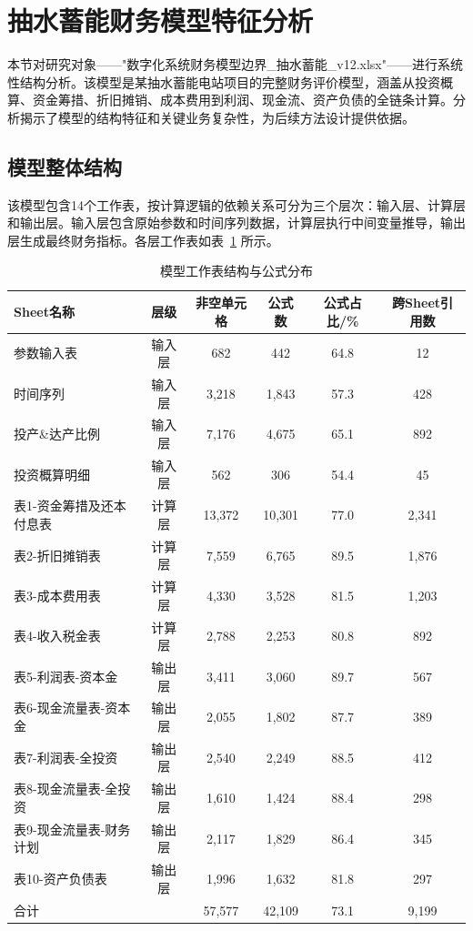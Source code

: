 \section{\heiti 抽水蓄能财务模型特征分析}

本节对研究对象——"数字化系统财务模型边界\_抽水蓄能\_v12.xlsx"——进行系统性结构分析。该模型是某抽水蓄能电站项目的完整财务评价模型，涵盖从投资概算、资金筹措、折旧摊销、成本费用到利润、现金流、资产负债的全链条计算。分析揭示了模型的结构特征和关键业务复杂性，为后续方法设计提供依据。

\subsection{\heiti 模型整体结构}

该模型包含14个工作表，按计算逻辑的依赖关系可分为三个层次：输入层、计算层和输出层。输入层包含原始参数和时间序列数据，计算层执行中间变量推导，输出层生成最终财务指标。各层工作表如表~\ref{tab:sheets} 所示。

\clearpage

\begin{table}[t]
	\centering
	\caption{模型工作表结构与公式分布}
	\label{tab:sheets}
	\vspace {-2.5mm}
	\begin{center}
		\begin{tabular}{lccccc}
			\toprule
			Sheet名称 & 层级 & 非空单元格 & 公式数 & 公式占比/\% & 跨Sheet引用数 \\
			\hline
			参数输入表 & 输入层 & 682 & 442 & 64.8 & 12 \\
			时间序列 & 输入层 & 3,218 & 1,843 & 57.3 & 428 \\
			投产\&达产比例 & 输入层 & 7,176 & 4,675 & 65.1 & 892 \\
			投资概算明细 & 输入层 & 562 & 306 & 54.4 & 45 \\
			表1-资金筹措及还本付息表 & 计算层 & 13,372 & 10,301 & 77.0 & 2,341 \\
			表2-折旧摊销表 & 计算层 & 7,559 & 6,765 & 89.5 & 1,876 \\
			表3-成本费用表 & 计算层 & 4,330 & 3,528 & 81.5 & 1,203 \\
			表4-收入税金表 & 计算层 & 2,788 & 2,253 & 80.8 & 892 \\
			表5-利润表-资本金 & 输出层 & 3,411 & 3,060 & 89.7 & 567 \\
			表6-现金流量表-资本金 & 输出层 & 2,055 & 1,802 & 87.7 & 389 \\
			表7-利润表-全投资 & 输出层 & 2,540 & 2,249 & 88.5 & 412 \\
			表8-现金流量表-全投资 & 输出层 & 1,610 & 1,424 & 88.4 & 298 \\
			表9-现金流量表-财务计划 & 输出层 & 2,117 & 1,829 & 86.4 & 345 \\
			表10-资产负债表 & 输出层 & 1,996 & 1,632 & 81.8 & 297 \\
			\hline
			合计 & & 57,577 & 42,109 & 73.1 & 9,199 \\
			\bottomrule
		\end{tabular}
	\end{center}
\end{table}

